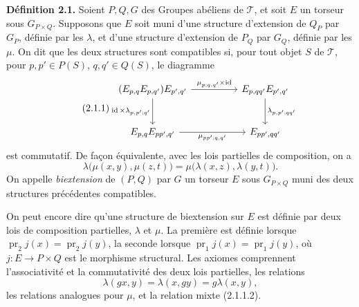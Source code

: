 \documentclass[11pt]{article}
\providecommand{\pr}{\operatorname{pr}}
\providecommand{\id}{\operatorname{id}}
\begin{document}
\textbf{Définition 2.1.}  Soient \(P,Q,G\) des Groupes abéliens de \(\mathcal T\), et soit \(E\) un torseur sous \(G_{P\times Q}\).  Supposons que \(E\) soit muni d'une structure d'extension de \(Q_P\) par \(G_P\), définie par les \(\lambda\), et d'une structure d'extension de \(P_Q\) par \(G_Q\), définie par les \(\mu\).  On dit que les deux structures sont compatibles si, pour tout objet \(S\) de \(\mathcal T\), pour \(p,p'\in P(S)\), \(q,q'\in Q(S)\), le diagramme
\begin{equation}\tag{2.1.1}
\begin{tikzcd}[column sep=huge,row sep=large]
(E_{p,q}E_{p,q'})E_{p',q'}
\arrow[r,"\mu_{p;q,q'}\times\id"]
\arrow[d,"\id\times\lambda_{p,p';q'}"']
& E_{p,qq'}E_{p',q'}\arrow[d,"\lambda_{p,p';qq'}"]\\
E_{p,q}E_{pp',q'}\arrow[r,"\mu_{pp';q,q'}"']&E_{pp',qq'}
\end{tikzcd}
\end{equation}
est commutatif.  De façon équivalente, avec les lois partielles de composition, on a
\begin{equation}\tag{2.1.1.2}
  \lambda\bigl(\mu(x,y),\mu(z,t)\bigr)
  =
  \mu\bigl(\lambda(x,z),\lambda(y,t)\bigr).
\end{equation}
On appelle \emph{biextension} de \((P,Q)\) par \(G\) un torseur \(E\) sous \(G_{P\times Q}\) muni des deux structures précédentes compatibles.

On peut encore dire qu'une structure de biextension sur \(E\) est définie par deux lois de composition partielles, \(\lambda\) et \(\mu\).  La première est définie lorsque \(\pr_2 j(x)=\pr_2 j(y)\), la seconde lorsque \(\pr_1 j(x)=\pr_1 j(y)\), où \(j:E\to P\times Q\) est le morphisme structural.  Les axiomes comprennent l'associativité et la commutativité des deux lois partielles, les relations
\begin{equation}\tag{2.1.1.1}
  \lambda(gx,y)=\lambda(x,gy)=g\lambda(x,y),
\end{equation}
les relations analogues pour \(\mu\), et la relation mixte (2.1.1.2).
\end{document}

